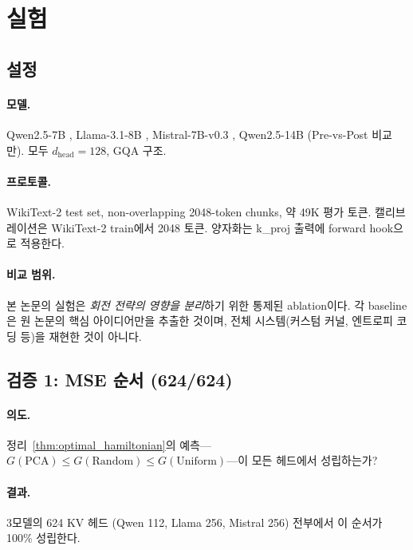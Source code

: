 \section{실험}
\label{sec:experiments}

\subsection{설정}
\label{sec:exp_setup}

\paragraph{모델.} Qwen2.5-7B \citep{qwen2024qwen25}, Llama-3.1-8B \citep{grattafiori2024llama3}, Mistral-7B-v0.3 \citep{jiang2023mistral}, Qwen2.5-14B (Pre-vs-Post 비교만). 모두 $d_{\mathrm{head}}=128$, GQA 구조.

\paragraph{프로토콜.} WikiText-2 test set, non-overlapping 2048-token chunks, 약 49K 평가 토큰. 캘리브레이션은 WikiText-2 train에서 2048 토큰. 양자화는 k\_proj 출력에 forward hook으로 적용한다.

\paragraph{비교 범위.} 본 논문의 실험은 \emph{회전 전략의 영향을 분리}하기 위한 통제된 ablation이다. 각 baseline은 원 논문의 핵심 아이디어만을 추출한 것이며, 전체 시스템(커스텀 커널, 엔트로피 코딩 등)을 재현한 것이 아니다.


\subsection{검증 1: MSE 순서 (624/624)}
\label{sec:exp_mse}

\paragraph{의도.} 정리~\ref{thm:optimal_hamiltonian}의 예측---$G(\mathrm{PCA}) \leq G(\mathrm{Random}) \leq G(\mathrm{Uniform})$---이 모든 헤드에서 성립하는가?

\paragraph{결과.} 3모델의 624 KV 헤드 (Qwen 112, Llama 256, Mistral 256) 전부에서 이 순서가 100\% 성립한다.

